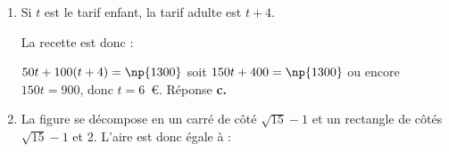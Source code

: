 
\medskip

%

\begin{enumerate}
\item %


%
Si $t$ est le tarif enfant, la tarif adulte est $t + 4$.

La recette est donc :

$50t + 100 (t + 4) = \np{1300}$ soit $150t + 400 = \np{1300}$ ou encore $150t = 900$, donc $t = 6$~\euro. Réponse \textbf{c.}
\item %

 
%
La figure se décompose en un carré de côté $\sqrt{15}  - 1$ et un rectangle de côtés $\sqrt{15}  - 1$ et $2$. L'aire est donc égale à :


\end{enumerate}
